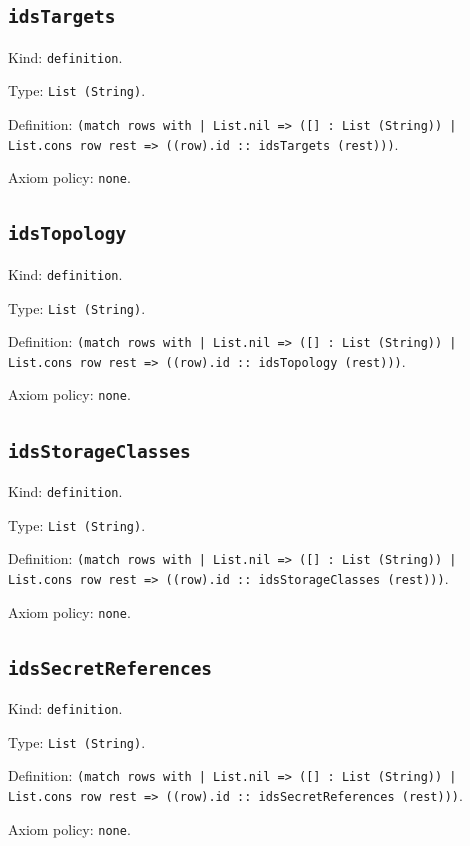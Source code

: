 \documentclass[11pt]{article}
\begin{document}
\subsection*{\texttt{idsTargets}}
\noindent Kind: \texttt{definition}.\par
\noindent Type: \texttt{List (String)}.\par
\noindent Definition: \texttt{(match rows with | List.nil => ([] : List (String)) | List.cons row rest => ((row).id :: idsTargets (rest)))}.\par
\noindent Axiom policy: \texttt{none}.\par
\subsection*{\texttt{idsTopology}}
\noindent Kind: \texttt{definition}.\par
\noindent Type: \texttt{List (String)}.\par
\noindent Definition: \texttt{(match rows with | List.nil => ([] : List (String)) | List.cons row rest => ((row).id :: idsTopology (rest)))}.\par
\noindent Axiom policy: \texttt{none}.\par
\subsection*{\texttt{idsStorageClasses}}
\noindent Kind: \texttt{definition}.\par
\noindent Type: \texttt{List (String)}.\par
\noindent Definition: \texttt{(match rows with | List.nil => ([] : List (String)) | List.cons row rest => ((row).id :: idsStorageClasses (rest)))}.\par
\noindent Axiom policy: \texttt{none}.\par
\subsection*{\texttt{idsSecretReferences}}
\noindent Kind: \texttt{definition}.\par
\noindent Type: \texttt{List (String)}.\par
\noindent Definition: \texttt{(match rows with | List.nil => ([] : List (String)) | List.cons row rest => ((row).id :: idsSecretReferences (rest)))}.\par
\noindent Axiom policy: \texttt{none}.\par
\end{document}
